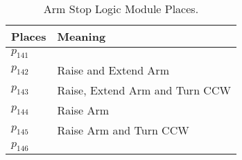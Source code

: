 \begin{table}[H]
\caption{Arm Stop Logic Module Places.}
\centering
\begin{tabular}{M{5cm}M{10cm}}
Places & Meaning\\
\hline
\hyperlink{partialNet:p1411}{\hypertarget{partialTable:p141}{$p_{141}$}} & \\
\hyperlink{partialNet:p1421}{\hypertarget{partialTable:p142}{$p_{142}$}} & Raise and Extend Arm\\
\hyperlink{partialNet:p1431}{\hypertarget{partialTable:p143}{$p_{143}$}} & Raise, Extend Arm and Turn CCW\\
\hyperlink{partialNet:p1441}{\hypertarget{partialTable:p144}{$p_{144}$}} & Raise Arm\\
\hyperlink{partialNet:p1451}{\hypertarget{partialTable:p145}{$p_{145}$}} & Raise Arm and Turn CCW\\
\hyperlink{partialNet:p1461}{\hypertarget{partialTable:p146}{$p_{146}$}} & \\
\end{tabular}
\end{table}
